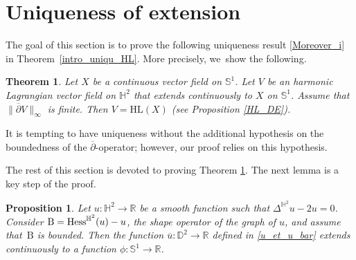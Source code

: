 \documentclass[11pt]{article}
\makeatletter
\DeclareRobustCommand{\mathbbm}[1]{\csname jepbb@#1\endcsname}
\theoremstyle{plain}
\newtheorem{theorem}[cor]{Theorem}
\newtheorem{prop}[cor]{Proposition}
\theoremstyle{definition}
\newcommand{\hess}{\mathrm{Hess}^{\mathbb{H}^2}}
\newcommand{\B}{\mathrm{B}}
\makeatother
\begin{document}
\section{Uniqueness of extension}\label{sec_uniquness}
The goal of this section is to prove the following uniqueness result \eqref{Moreover_i} in Theorem~\ref{intro_uniqu_HL}. More precisely, we~show the following.

\begin{theorem}\label{uniqTH1HL}
Let $X$ be a continuous vector field on $\mathbb{S}^1$. Let $V$ be an harmonic Lagrangian vector field on $\mathbb{H}^2$ that extends continuously to $X$ on $\mathbb{S}^1$. Assume that $\lVert \overline{\partial}V\rVert_{\infty}$ is finite. Then $V=\mathrm{HL}(X)$ (see Proposition \ref{HL_DE}).
\end{theorem}
It is tempting to have uniqueness without the additional hypothesis on the boundedness of the $\overline{\partial}$-operator; however, our proof relies on this hypothesis.

The rest of this section is devoted to proving Theorem \ref{uniqTH1HL}. The next lemma is a key step of the proof.

\begin{prop}\label{zygumund_imply_extension}
Let \(u: \mathbb{H}^2 \to \mathbb{R} \) be a smooth function such that \(\Delta^{\mathbb{H}^2} u - 2u = 0 \). Consider \(\B = \hess(u) - u \mathbbm{1} \), the shape operator of the graph of \(u \), and assume that~\(\B \) is bounded. Then the function \(\overline{u}: \mathbb{D}^2 \to \mathbb{R} \) defined in \eqref{u_et_u_bar} extends continuously to a function \(\phi: \mathbb{S}^1 \to \mathbb{R} \).
\end{prop}
\end{document}
